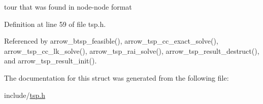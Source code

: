 tour that was found in node-node format 

Definition at line 59 of file tsp.h.

Referenced by arrow\_\-btsp\_\-feasible(), arrow\_\-tsp\_\-cc\_\-exact\_\-solve(), arrow\_\-tsp\_\-cc\_\-lk\_\-solve(), arrow\_\-tsp\_\-rai\_\-solve(), arrow\_\-tsp\_\-result\_\-destruct(), and arrow\_\-tsp\_\-result\_\-init().

The documentation for this struct was generated from the following file:\begin{CompactItemize}
\item 
include/\hyperlink{tsp_8h}{tsp.h}\end{CompactItemize}
